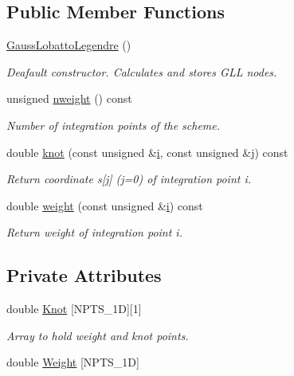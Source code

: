 \subsection*{Public Member Functions}
\begin{DoxyCompactItemize}
\item 
\hyperlink{classoomph_1_1GaussLobattoLegendre_3_011_00_01NPTS__1D_01_4_a9f4ffd01db8b67754125ea0f4e9d937a}{Gauss\+Lobatto\+Legendre} ()
\begin{DoxyCompactList}\small\item\em Deafault constructor. Calculates and stores G\+LL nodes. \end{DoxyCompactList}\item 
unsigned \hyperlink{classoomph_1_1GaussLobattoLegendre_3_011_00_01NPTS__1D_01_4_a717e3061c41c615075bf7934ddd39167}{nweight} () const
\begin{DoxyCompactList}\small\item\em Number of integration points of the scheme. \end{DoxyCompactList}\item 
double \hyperlink{classoomph_1_1GaussLobattoLegendre_3_011_00_01NPTS__1D_01_4_ac5f35d0a83a52c37dab7578c06fca9cc}{knot} (const unsigned \&\hyperlink{cfortran_8h_adb50e893b86b3e55e751a42eab3cba82}{i}, const unsigned \&j) const
\begin{DoxyCompactList}\small\item\em Return coordinate s\mbox{[}j\mbox{]} (j=0) of integration point i. \end{DoxyCompactList}\item 
double \hyperlink{classoomph_1_1GaussLobattoLegendre_3_011_00_01NPTS__1D_01_4_a234219d47fb942b9870a0663e2dda007}{weight} (const unsigned \&\hyperlink{cfortran_8h_adb50e893b86b3e55e751a42eab3cba82}{i}) const
\begin{DoxyCompactList}\small\item\em Return weight of integration point i. \end{DoxyCompactList}\end{DoxyCompactItemize}
\subsection*{Private Attributes}
\begin{DoxyCompactItemize}
\item 
double \hyperlink{classoomph_1_1GaussLobattoLegendre_3_011_00_01NPTS__1D_01_4_a8eecd7a6e3e469637a13e33135ce7735}{Knot} \mbox{[}N\+P\+T\+S\+\_\+1D\mbox{]}\mbox{[}1\mbox{]}
\begin{DoxyCompactList}\small\item\em Array to hold weight and knot points. \end{DoxyCompactList}\item 
double \hyperlink{classoomph_1_1GaussLobattoLegendre_3_011_00_01NPTS__1D_01_4_a77ab182414338335497cd75903594306}{Weight} \mbox{[}N\+P\+T\+S\+\_\+1D\mbox{]}
\end{DoxyCompactItemize}
